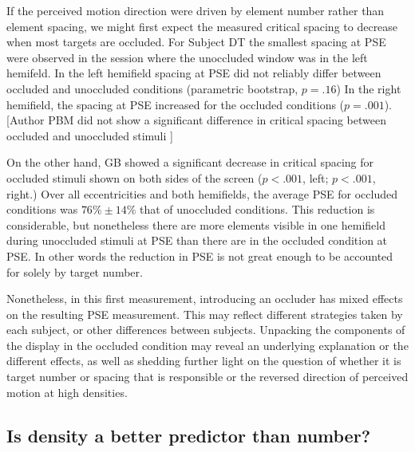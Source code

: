 \documentclass[../manuscript]{subfiles}
\begin{document}
If the perceived motion direction were driven by element number rather than element spacing, we might first expect the measured critical spacing to decrease when most targets are occluded. For Subject DT the smallest spacing at PSE were observed in the session where the unoccluded window was in the left hemifeld. In the left hemifield spacing at PSE did not reliably differ between occluded and unoccluded conditions (parametric bootstrap, \ensuremath{p = .16}) In the right hemifield, the spacing at PSE increased for the occluded conditions (\ensuremath{p = .001}). [Author PBM did not show a significant difference in critical spacing between occluded and unoccluded stimuli ]


On the other hand, GB showed a significant decrease in critical spacing for occluded stimuli shown on both sides of the screen (\ensuremath{p < .001}, left; \ensuremath{p < .001}, right.) Over all eccentricities and both hemifields, the average PSE for occluded conditions was $\ensuremath{76\%} \pm \ensuremath{14\%}$ that of unoccluded conditions.  This reduction is considerable, but nonetheless there are more elements visible in one hemifield during unoccluded stimuli at PSE than there are in the occluded condition at PSE. In other words the reduction in PSE is not great enough to be accounted for solely by target number.

Nonetheless, in this first measurement, introducing an occluder has mixed effects on the resulting PSE measurement. This may reflect different strategies taken by each subject, or other differences between subjects. Unpacking the components of the display in the occluded condition may reveal an underlying explanation or the different effects, as well as shedding further light on the question of whether it is target number or spacing that is responsible or the reversed direction of perceived motion at high densities.

\subsection{Is density a better predictor than number?}

\end{document}
